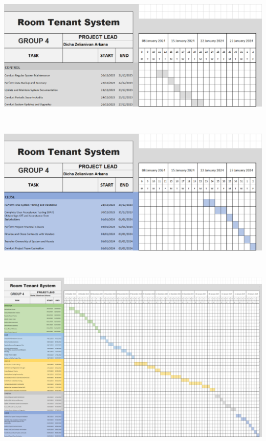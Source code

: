 \documentclass[12pt,titlepage,a4paper]{report}
\begin{document}
    \begin{turn}{90}
        \includegraphics[width=\textheight]{images/figures/gant-Ctrl.png}
    \end{turn}\\
    \begin{turn}{90}
        \includegraphics[width=\textheight]{images/figures/gant-Close.png}
    \end{turn}\\
    \begin{turn}{90}
        \includegraphics[width=\textheight]{images/figures/gant-chart2.png}
    \end{turn}\\
\end{document}
